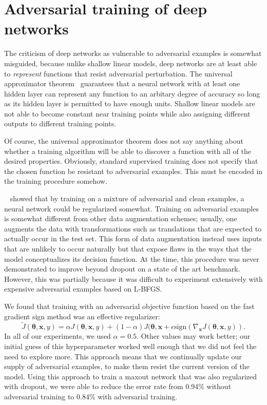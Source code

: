 \documentclass{article} %
\def\eps{{\epsilon}}
\def\sign{{\text{sign}}}
\def\vtheta{{\bm{\theta}}}
\def\vx{{\bm{x}}}
\begin{document}
\section{Adversarial training of deep networks}

The criticism of deep networks as vulnerable to adversarial examples is somewhat misguided, because
unlike shallow linear models, deep networks are at least able to {\em represent} functions that resist
adversarial perturbation. The universal approximator theorem~\citep{Hornik89} guarantees that a neural network
with at least one hidden layer can represent any function to an arbitary degree of accuracy so long as its hidden layer is permitted to
have enough units. Shallow linear models are not able to become constant near training points while
also assigning different outputs to different training points.

Of course, the universal approximator theorem does not say anything about whether a training algorithm
will be able to discover a function with all of the desired properties. Obviously, standard supervised
training does not specify that the chosen function be resistant to adversarial examples. This must be
encoded in the training procedure somehow.

~\citet{Szegedy-ICLR2014} showed that by training on a mixture of adversarial and clean examples, a
neural network could be regularized somewhat.
Training on adversarial examples is somewhat different from other data augmentation schemes; usually, one augments
the data with transformations such as translations that are expected to actually occur in the
test set. This form of data augmentation instead uses inputs that are unlikely to occur naturally
but that expose flaws in the ways that the model conceptualizes its decision function.
At the time, this procedure was never demonstrated to improve beyond dropout on a state of the art benchmark.
However, this was partially because it was difficult to experiment extensively with expensive adversarial examples
based on L-BFGS.

We found that training with an adversarial objective function based on the fast gradient sign method
was an effective regularizer: \[ \tilde{J}(\vtheta, \vx, y) = \alpha J(\vtheta, \vx, y) + (1-\alpha) J(\vtheta,
\vx + \eps \sign \left( \nabla_\vx J(\vtheta, \vx, y) \right). \]
In all of our experiments, we used $\alpha = 0.5$. Other values may work better; our initial guess
of this hyperparameter worked well enough that we did not feel the need to explore more.
This approach means that we continually update our supply of adversarial examples, to make them
resist the current version of the model.
Using this approach to train a maxout network that was also regularized with dropout, we were
able to reduce the error rate from 0.94\% without adversarial training to 0.84\% with adversarial
training.
\end{document}
